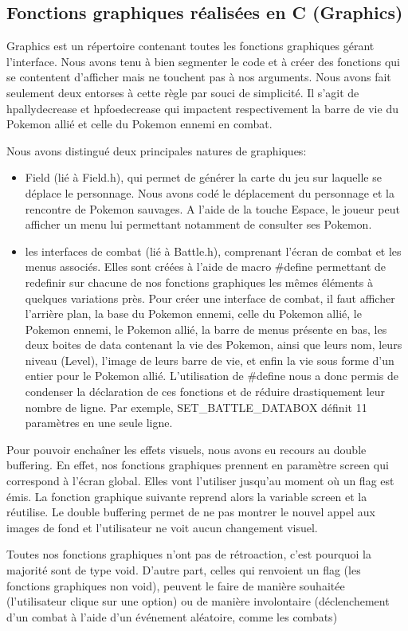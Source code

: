 \subsection{Fonctions graphiques réalisées en C (Graphics)}

Graphics est un répertoire contenant toutes les fonctions graphiques gérant l'interface. Nous avons tenu à bien segmenter le code et à créer des fonctions qui se contentent d'afficher mais ne touchent pas à nos arguments. Nous avons fait seulement deux entorses à cette règle par souci de simplicité. Il s'agit de 
 hpallydecrease et hpfoedecrease qui impactent respectivement la barre de vie du Pokemon allié et celle du Pokemon ennemi en combat.
 
Nous avons distingué deux principales natures de graphiques:

\begin{itemize}
\item Field (lié à Field.h), qui permet de générer la carte du jeu sur laquelle se déplace le personnage. Nous avons codé le déplacement du personnage et la rencontre de Pokemon sauvages. A l'aide de la touche Espace, le joueur peut afficher un menu lui permettant notamment de consulter ses Pokemon.
\item les interfaces de combat (lié à Battle.h), comprenant l'écran de combat et les menus associés. Elles sont créées à l'aide de macro \#define permettant de redefinir sur chacune de nos fonctions graphiques les mêmes éléments à quelques variations près. Pour créer une interface de combat, il faut afficher l'arrière plan, la base du Pokemon ennemi, celle du Pokemon allié, le Pokemon ennemi, le Pokemon allié, la barre de menus présente en bas, les deux boites de data contenant la vie des Pokemon, ainsi que leurs nom, leurs niveau (Level), l'image de leurs barre de vie, et enfin la vie sous forme d'un entier pour le Pokemon allié. L'utilisation de \#define nous a donc permis de condenser la déclaration de ces fonctions et de réduire drastiquement leur nombre de ligne. Par exemple, SET\_BATTLE\_DATABOX définit 11 paramètres en une seule ligne.  
\end{itemize}

Pour pouvoir enchaîner les effets visuels, nous avons eu recours au double buffering. En effet, nos fonctions graphiques prennent en paramètre screen qui correspond à l'écran global. Elles vont l'utiliser jusqu'au moment où un flag est émis. La fonction graphique suivante reprend alors la variable screen et la réutilise. Le double buffering permet de ne pas montrer le nouvel appel aux images de fond et l'utilisateur ne voit aucun changement visuel.

Toutes nos fonctions graphiques n'ont pas de rétroaction, c'est pourquoi la majorité sont de type void. D'autre part, celles qui renvoient un flag (les fonctions graphiques non void), peuvent le faire de manière souhaitée (l'utilisateur clique sur une option) ou de manière involontaire (déclenchement d'un combat à l'aide d'un événement aléatoire, comme les combats)